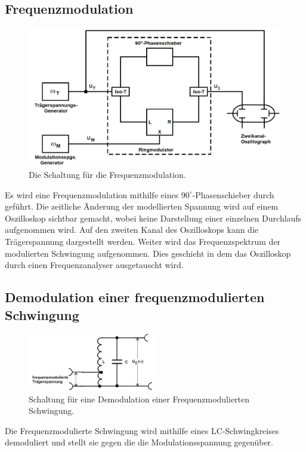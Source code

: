 \subsection{Frequenzmodulation}
\begin{figure}[h!]
	\centering
	\includegraphics[width = 3\textwidth/4]{../Grafiken/Versuchsaufbau_d_Frequenz.pdf}
	\caption{Die Schaltung für die Frequenzmodulation.\cite{V59}}
\end{figure}
Es wird eine Frequenzmodulation mithilfe eines $90^\circ$-Phasenschieber durch geführt.
Die zeitliche Änderung der modellierten Spannung wird auf einem Oszilloskop sichtbar gemacht, wobei keine Darstellung einer einzelnen Durchlaufs aufgenommen wird.
Auf den zweiten Kanal des Oszilloskops kann die Trägerspannung dargestellt werden.
Weiter wird das Frequenzspektrum der modulierten Schwingung aufgenommen. 
Dies geschieht in dem das Oszilloskop durch einen Frequenzanalyser ausgetauscht wird.
\subsection{Demodulation einer frequenzmodulierten Schwingung}
\begin{figure}[h!]
	\centering
	\includegraphics[width = 0.5\textwidth]{../Grafiken/Versuchsaufbau_h_FreqDemo.pdf}
	\caption{Schaltung für eine Demodulation einer Frequenzmodulierten Schwingung.\cite{V59}}
\end{figure}
Die Frequenzmodulierte Schwingung wird mithilfe eines LC-Schwingkreises demoduliert und stellt sie gegen die die Modulationsspannung gegenüber.